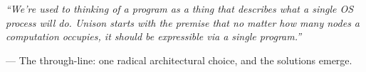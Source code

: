 \documentclass[11pt,letterpaper]{article}
\begin{document}
\vspace{1em}

\begin{quotebox}
\textit{``We're used to thinking of a program as a thing that describes what a single OS process will do. Unison starts with the premise that no matter how many nodes a computation occupies, it should be expressible via a single program.''}

\vspace{0.5em}
\hfill --- The through-line: one radical architectural choice, and the solutions emerge.
\end{quotebox}
\end{document}
